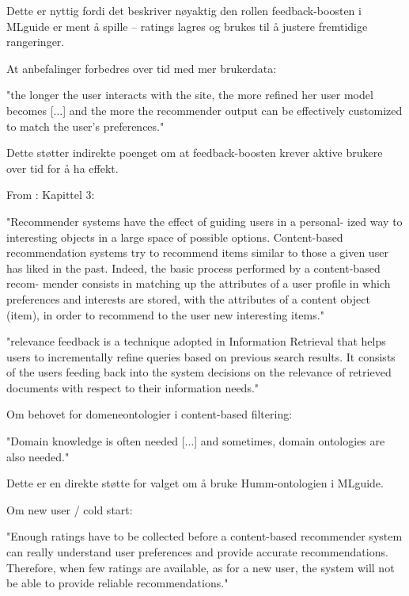 Dette er nyttig fordi det beskriver nøyaktig den rollen feedback-boosten i MLguide er ment å spille – ratings lagres og brukes til å justere fremtidige rangeringer.

At anbefalinger forbedres over tid med mer brukerdata:

"the longer the user interacts with the site, the more refined her user model becomes [...] and the more the recommender output can be effectively customized to match the user's preferences."

Dette støtter indirekte poenget om at feedback-boosten krever aktive brukere over tid for å ha effekt.

From \parencite[Chapter~3]{ricci2010recommender_systems_handbook} :
Kapittel 3:

"Recommender systems have the effect of guiding users in a personal-
ized way to interesting objects in a large space of possible options. Content-based
recommendation systems try to recommend items similar to those a given user has
liked in the past. Indeed, the basic process performed by a content-based recom-
mender consists in matching up the attributes of a user profile in which preferences
and interests are stored, with the attributes of a content object (item), in order to
recommend to the user new interesting items."

"relevance feedback is a technique adopted in Information Retrieval that helps users to incrementally refine queries based on previous search results. It consists of the users feeding back into the system decisions on the relevance of retrieved documents with respect to their information needs."

Om behovet for domeneontologier i content-based filtering:

"Domain knowledge is often needed [...] and sometimes, domain ontologies are also needed."

Dette er en direkte støtte for valget om å bruke Humm-ontologien i MLguide.

Om new user / cold start:

"Enough ratings have to be collected before a content-based recommender system can really understand user preferences and provide accurate recommendations. Therefore, when few ratings are available, as for a new user, the system will not be able to provide reliable recommendations."